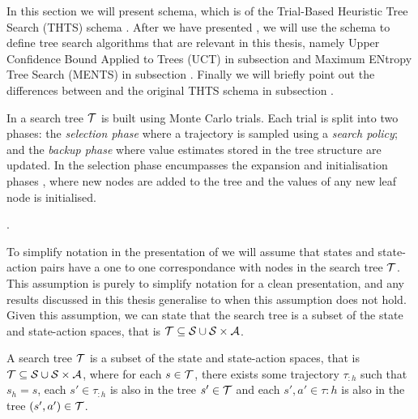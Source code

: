 


        In this section we will present \thtspp schema, which is  of the Trial-Based Heuristic Tree Search (THTS) schema . After we have presented \thtspp, we will use the schema to define tree search algorithms that are relevant in this thesis, namely Upper Confidence Bound Applied to Trees (UCT)  in subsection  and Maximum ENtropy Tree Search (MENTS) in subsection . Finally we will briefly point out the differences between \thtspp and the original THTS schema in subsection .


        In \thtspp\ewe a search tree $\mathcal{T}$ is built using Monte Carlo trials. Each trial is split into two phases: the \textit{selection phase} where a trajectory is sampled using a \textit{search policy}; and the \textit{backup phase} where value estimates stored in the tree structure are updated. In \thtspp\ewe the selection phase encumpasses the expansion and initialisation phases , where new nodes are added to the tree and the values of any new leaf node is initialised. 

        .

        To simplify notation in the presentation of \thtspp\ewe we will assume that states and state-action pairs have a one to one correspondance with nodes in the search tree $\mathcal{T}$. This assumption is purely to simplify notation for a clean presentation, and any results discussed in this thesis generalise to when this assumption does not hold. Given this assumption, we can state that the search tree is a subset of the state and state-action spaces, that is $\mathcal{T}\subseteq \mathcal{S} \cup \mathcal{S} \times \mathcal{A}$. 

        \begin{defn}
            A \textnormal{search tree} $\mathcal{T}$ is a subset of the state and state-action spaces, that is $\mathcal{T}\subseteq \mathcal{S} \cup \mathcal{S} \times \mathcal{A}$, where for each $s\in\mathcal{T}$, there exists some trajectory $\tau_{:h}$ such that $s_h = s$, each $s'\in\tau_{:h}$ is also in the tree $s'\in\mathcal{T}$ and each $s',a'\in\tau{:h}$ is also in the tree $(s',a')\in\mathcal{T}$.
        \end{defn}

